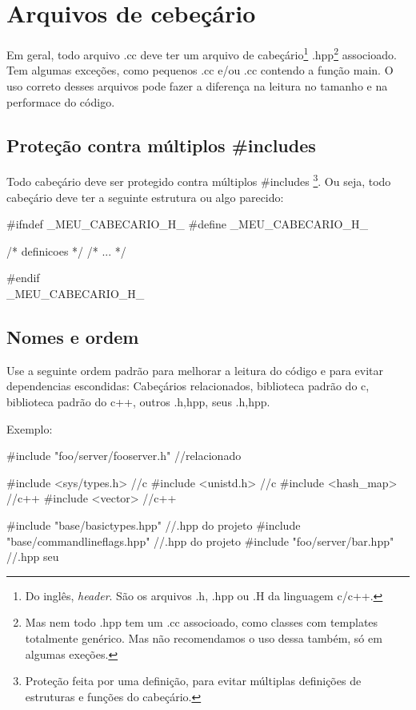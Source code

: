 \documentclass{article}
\begin{document}
\section{Arquivos de cebeçário}

Em geral, todo arquivo .cc deve ter um arquivo de cabeçário\footnote{Do inglês, \emph{header}. São os arquivos .h, .hpp ou .H da linguagem c/c++.} .hpp\footnote{Mas nem todo .hpp tem um .cc associoado, como classes com templates totalmente genérico. Mas não recomendamos o uso dessa também, só em algumas exeções.} associoado. Tem algumas exceções, como pequenos .cc e/ou .cc contendo a função main. O uso correto desses arquivos pode fazer a diferença na leitura no tamanho e na performace do código.

\subsection{Proteção contra múltiplos \#includes}

Todo cabeçário deve ser protegido contra  múltiplos \#includes \footnote{Proteção feita por uma definição, para evitar múltiplas definições de estruturas e funções do cabeçário.}. Ou seja, todo cabeçário deve ter a seguinte estrutura ou algo parecido:

\begin{code}
#ifndef _MEU_CABECARIO_H_
#define _MEU_CABECARIO_H_

/*	definicoes	*/
/*	   ...   	*/

#endif \\_MEU_CABECARIO_H_

\end{code}

\subsection{Nomes e ordem}
Use a seguinte ordem padrão para melhorar a leitura do código e para evitar dependencias escondidas: Cabeçários relacionados, biblioteca padrão do c, biblioteca padrão do c++, outros .{h,hpp}, seus .{h,hpp}.

Exemplo:
\begin{code}
#include "foo/server/fooserver.h" //relacionado

#include <sys/types.h> //c
#include <unistd.h> //c
#include <hash_map> //c++
#include <vector> //c++

#include "base/basictypes.hpp" //.hpp do projeto
#include "base/commandlineflags.hpp" //.hpp do projeto
#include "foo/server/bar.hpp" //.hpp seu
\end{code}
\end{document}
